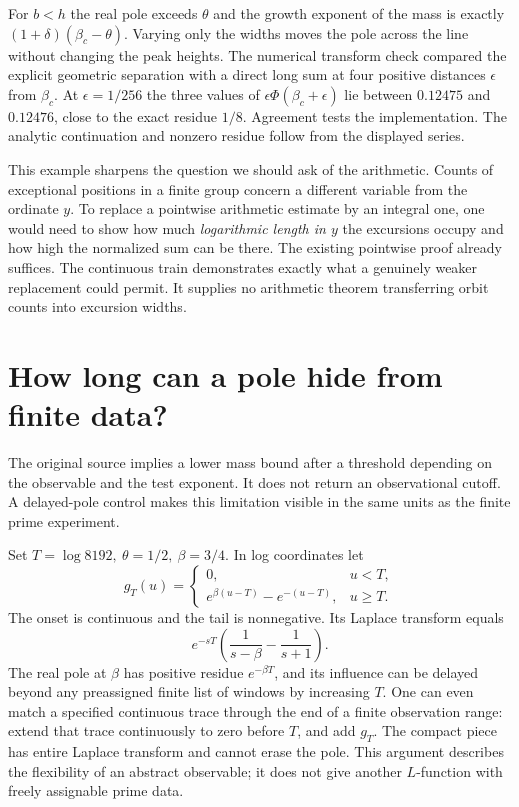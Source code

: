 \documentclass[12pt,letterpaper]{article}
\begin{document}
For \(b<h\) the real pole exceeds \(\theta\) and the growth exponent of the mass is exactly \((1+\delta)(\beta_c-\theta)\). Varying only the widths moves the pole across the line without changing the peak heights. The numerical transform check compared the explicit geometric separation with a direct long sum at four positive distances \(\epsilon\) from \(\beta_c\). At \(\epsilon=1/256\) the three values of \(\epsilon\Phi(\beta_c+\epsilon)\) lie between \(0.12475\) and \(0.12476\), close to the exact residue \(1/8\). Agreement tests the implementation. The analytic continuation and nonzero residue follow from the displayed series.

This example sharpens the question we should ask of the arithmetic. Counts of exceptional positions in a finite group concern a different variable from the ordinate \(y\). To replace a pointwise arithmetic estimate by an integral one, one would need to show how much \emph{logarithmic length in \(y\)} the excursions occupy and how high the normalized sum can be there. The existing pointwise proof already suffices. The continuous train demonstrates exactly what a genuinely weaker replacement could permit. It supplies no arithmetic theorem transferring orbit counts into excursion widths.

\section{How long can a pole hide from finite data?}
The original source implies a lower mass bound after a threshold depending on the observable and the test exponent. It does not return an observational cutoff. A delayed-pole control makes this limitation visible in the same units as the finite prime experiment.

Set \(T=\log8192,\ \theta=1/2,\ \beta=3/4\). In log coordinates let
\[
  g_T(u)=
     \begin{cases}
      0,&u<T,\\
      e^{\beta(u-T)}-e^{-(u-T)},&u\ge T .
     \end{cases}
\]
The onset is continuous and the tail is nonnegative. Its Laplace transform equals
\[
        e^{-sT}\left(\frac1{s-\beta}-\frac1{s+1}\right).
\]
The real pole at \(\beta\) has positive residue \(e^{-\beta T}\), and its influence can be delayed beyond any preassigned finite list of windows by increasing \(T\). One can even match a specified continuous trace through the end of a finite observation range: extend that trace continuously to zero before \(T\), and add \(g_T\). The compact piece has entire Laplace transform and cannot erase the pole. This argument describes the flexibility of an abstract observable; it does not give another \(L\)-function with freely assignable prime data.
\end{document}
